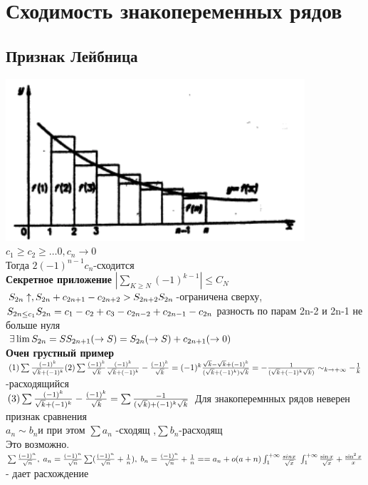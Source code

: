 \documentclass[12pt, a4paper]{article}
\begin{document}
	\section{Сходимость  знакопеременных рядов}
	
	\subsection{Признак Лейбница}
	\includegraphics{leidn.png}
	$ c_1 \geq c_2 \geq \dots 0 , c_n \rightarrow 0 $\\
	Тогда $ 2(-1)^{n-1}c_n $-сходится\\ 
	\textbf{Секретное приложение}
	$ |\sum_{K \geq N}(-1)^{k-1}| \leq C_N $\\
	
	$ S_{2n} \uparrow,  S_{2n}+c_{2n+1} - c_{2n +2} > S_{2n+2}  \\
	S_{2n}$-ограничена сверху, $ S_{2n \leq c_1} \\
	S_{2n}= c_1 -  c_2 + c_3- c_{2n-2} + c_{2n-1}  - c_{2n}$ разность по парам 2n-2 и  2n-1  не больше нуля \\
	$ \exists \lim S_{2n} = S \\
	S_{2n+1}(\rightarrow S)=S_{2n}(\rightarrow S)+ c_{2n + 1}(\rightarrow 0) $\\
	\textbf{Очен грустный пример}\\
	$ (1)\sum \frac{(-1)^k}{\sqrt{k}+(-1)^k} \\
	(2)  \sum \frac{(-1)^k}{\sqrt{k}} \\
	\frac{(-1)^k}{\sqrt{k}+(-1)^k} - \frac{(-1)^k}{\sqrt{k}}=(-1)^k \frac{\sqrt{k} - \sqrt{k}+(-1)^k}{(\sqrt{k}+(-1)^k)\sqrt{k}}= -\frac{1}{(\sqrt{k}+(-1)^k \sqrt{k})} \sim_{k \rightarrow +\infty} - \frac{1}{k} \\$ -расходящийся \\
	$ (3) \sum \frac{(-1)^k}{\sqrt{k} + (-1)^k} - \frac{(-1)^k}{\sqrt{k}} = \sum \frac{-1}{(\sqrt{k})+(-1)^k \sqrt{k}} \\$
	Для знакоперемнных рядов  неверен признак сравнения \\
	$ a_n \sim b_n $и при этом  $\sum a_n$ -сходящ ,$ \sum b_n$-расходящ  \\ Это возможно. \\
	$ \sum \frac{(-1)^n}{\sqrt{n}}, \; a_n = \frac{(-1)^n}{\sqrt{n}} \\
	\sum (\frac{(-1)^n}{\sqrt{n}} +\frac{1}{n}), \; b_n = \frac{(-1)^n}{\sqrt{n}}+\frac{1}{n} == a_n + o(a+n)\\
	\int_{1}^{+ \infty} \frac{sin x}{\sqrt{x}} \; \int_1^{+\infty} \frac{\sin x}{\sqrt{x}} + \frac{\sin^2x }{x}   $- дает расхождение\\
\end{document}
